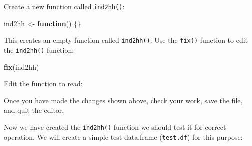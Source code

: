 \documentclass[12pt,a4paper]{book}
\newenvironment{Shaded}{\begin{snugshade}}{\end{snugshade}}
\newcommand{\ControlFlowTok}[1]{\textcolor[rgb]{0.13,0.29,0.53}{\textbf{#1}}}
\newcommand{\KeywordTok}[1]{\textcolor[rgb]{0.13,0.29,0.53}{\textbf{#1}}}
\newcommand{\NormalTok}[1]{#1}
\newcommand{\OperatorTok}[1]{\textcolor[rgb]{0.81,0.36,0.00}{\textbf{#1}}}
\newcommand{\OtherTok}[1]{\textcolor[rgb]{0.56,0.35,0.01}{#1}}
\newcommand{\StringTok}[1]{\textcolor[rgb]{0.31,0.60,0.02}{#1}}
\theoremstyle{definition}
\theoremstyle{definition}
\theoremstyle{definition}
\theoremstyle{remark}
\begin{document}
Create a new function called \texttt{ind2hh()}:

\begin{Shaded}
\begin{Highlighting}[]
\NormalTok{ind2hh <-}\StringTok{ }\ControlFlowTok{function}\NormalTok{() \{\}}
\end{Highlighting}
\end{Shaded}

This creates an empty function called \texttt{ind2hh()}. Use the
\texttt{fix()} function to edit the \texttt{ind2hh()} function:

\begin{Shaded}
\begin{Highlighting}[]
\KeywordTok{fix}\NormalTok{(ind2hh)}
\end{Highlighting}
\end{Shaded}

Edit the function to read:

\begin{Shaded}
\end{Shaded}

Once you have made the changes shown above, check your work, save the
file, and quit the editor.

Now we have created the \texttt{ind2hh()} function we should test it for
correct operation. We will create a simple test data.frame
(\texttt{test.df}) for this purpose:
\end{document}

